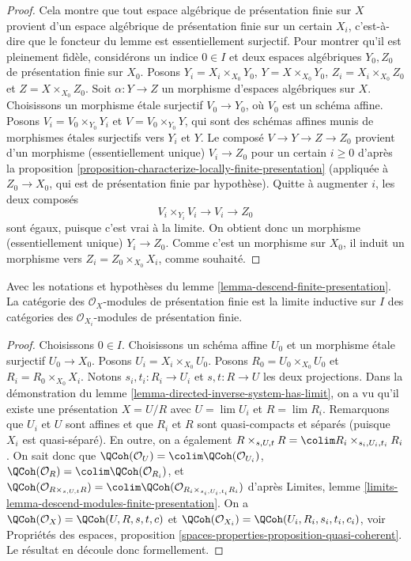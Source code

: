 \begin{proof}
\medskip\noindent
Cela montre que tout espace algébrique de présentation finie sur $X$ provient
d'un espace algébrique de présentation finie sur un certain $X_i$, c'est-à-dire
que le foncteur du lemme est essentiellement surjectif. Pour
montrer qu'il est pleinement fidèle, considérons un indice $0 \in I$ et deux
espaces algébriques $Y_0, Z_0$ de présentation finie sur $X_0$.
Posons $Y_i = X_i \times_{X_0} Y_0$, $Y = X \times_{X_0} Y_0$,
$Z_i = X_i \times_{X_0} Z_0$ et $Z = X \times_{X_0} Z_0$. Soit
$\alpha : Y \to Z$ un morphisme d'espaces algébriques sur $X$.
Choisissons un morphisme étale surjectif $V_0 \to Y_0$, où $V_0$ est
un schéma affine. Posons $V_i = V_0 \times_{Y_0} Y_i$ et
$V = V_0 \times_{Y_0} Y$, qui sont des schémas affines munis de
morphismes étales surjectifs vers $Y_i$ et $Y$. Le composé
$V \to Y \to Z \to Z_0$ provient d'un morphisme (essentiellement unique)
$V_i \to Z_0$ pour un certain $i \geq 0$ d'après la
proposition \ref{proposition-characterize-locally-finite-presentation}
(appliquée à $Z_0 \to X_0$, qui est de présentation finie par hypothèse).
Quitte à augmenter $i$, les deux composés
$$
V_i \times_{Y_i} V_i \to V_i \to Z_0
$$
sont égaux, puisque c'est vrai à la limite. On obtient donc un morphisme
(essentiellement unique) $Y_i \to Z_0$. Comme c'est un morphisme sur $X_0$,
il induit un morphisme vers $Z_i = Z_0 \times_{X_0} X_i$, comme souhaité.
\end{proof}

\begin{lemma}
\label{lemma-descend-modules-finite-presentation}
Avec les notations et hypothèses du
lemme \ref{lemma-descend-finite-presentation}.
La catégorie des $\mathcal{O}_X$-modules de présentation finie est la
limite inductive sur $I$ des catégories des $\mathcal{O}_{X_i}$-modules de
présentation finie.
\end{lemma}

\begin{proof}
Choisissons $0 \in I$. Choisissons un schéma affine $U_0$ et un morphisme
étale surjectif $U_0 \to X_0$. Posons $U_i = X_i \times_{X_0} U_0$.
Posons $R_0 = U_0 \times_{X_0} U_0$ et $R_i = R_0 \times_{X_0} X_i$.
Notons $s_i, t_i : R_i \to U_i$ et $s, t : R \to U$ les deux
projections. Dans la démonstration du
lemme \ref{lemma-directed-inverse-system-has-limit}, on a
vu qu'il existe une présentation $X = U/R$ avec
$U = \lim U_i$ et $R = \lim R_i$. Remarquons que $U_i$ et $U$ sont affines et
que $R_i$ et $R$ sont quasi-compacts et séparés (puisque $X_i$ est
quasi-séparé). En outre, on a également
$R \times_{s, U, t} R = \colim R_i \times_{s_i, U_i, t_i} R_i$.
On sait donc que
$\QCoh(\mathcal{O}_U) = \colim \QCoh(\mathcal{O}_{U_i})$,
$\QCoh(\mathcal{O}_R) = \colim \QCoh(\mathcal{O}_{R_i})$,
et
$\QCoh(\mathcal{O}_{R \times_{s, U, t} R}) =
\colim \QCoh(\mathcal{O}_{R_i \times_{s_i, U_i, t_i} R_i})$
d'après Limites, lemme \ref{limits-lemma-descend-modules-finite-presentation}.
On a $\QCoh(\mathcal{O}_X) = \QCoh(U, R, s, t, c)$ et
$\QCoh(\mathcal{O}_{X_i}) = \QCoh(U_i, R_i, s_i, t_i, c_i)$,
voir Propriétés des espaces, proposition
\ref{spaces-properties-proposition-quasi-coherent}.
Le résultat en découle donc formellement.
\end{proof}

